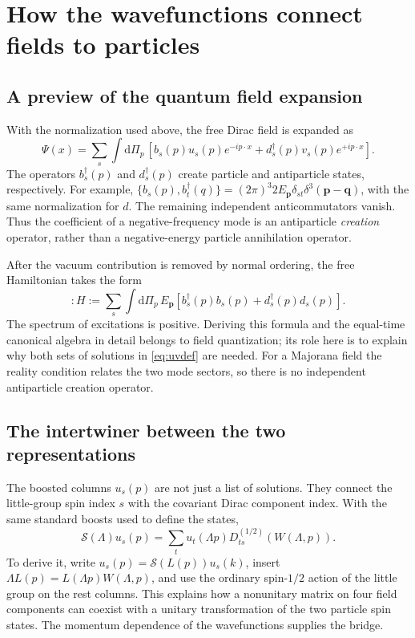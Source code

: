 \documentclass[11pt]{article}
\newcommand{\dd}{\mathrm{d}}
\begin{document}
\section{How the wavefunctions connect fields to particles}
\subsection{A preview of the quantum field expansion}
With the normalization used above, the free Dirac field is expanded as
\begin{equation}
 \Psi(x)=\sum_s\int\dd\Pi_p\,
 \left[b_s(p)u_s(p)e^{-ip\cdot x}
          +d_s^\dagger(p)v_s(p)e^{+ip\cdot x}\right].
 \label{eq:fieldexpansion}
\end{equation}
The operators \(b_s^\dagger(p)\) and \(d_s^\dagger(p)\) create
particle and antiparticle states, respectively. For example,
\(\{b_s(p),b_t^\dagger(q)\}=(2\pi)^3 2E_{\bm p}
\delta_{st}\delta^3(\bm p-\bm q)\), with the same normalization
for \(d\). The remaining independent anticommutators vanish.
Thus the coefficient of a negative-frequency mode is an antiparticle
\emph{creation} operator, rather than a negative-energy particle
annihilation operator.

After the vacuum contribution is removed by normal ordering, the
free Hamiltonian takes the form
\begin{equation}
 :H:=\sum_s\int\dd\Pi_p\,E_{\bm p}
          \left[b_s^\dagger(p)b_s(p)+d_s^\dagger(p)d_s(p)\right].
 \label{eq:positiveH}
\end{equation}
The spectrum of excitations is positive. Deriving this formula and
the equal-time canonical algebra in detail belongs to field
quantization; its role here is to explain why both sets of solutions
in \eqref{eq:uvdef} are needed. For a Majorana field the reality
condition relates the two mode sectors, so there is no independent
antiparticle creation operator.

\subsection{The intertwiner between the two representations}
The boosted columns \(u_s(p)\) are not just a list of solutions.
They connect the little-group spin index \(s\) with the covariant
Dirac component index. With the same standard boosts used to define
the states,
\begin{equation}
 \mathcal S(\Lambda)u_s(p)
   =\sum_tu_t(\Lambda p)
      D^{(1/2)}_{ts}\!\left(W(\Lambda,p)\right).
 \label{eq:intertwiner}
\end{equation}
To derive it, write
\(u_s(p)=\mathcal S(L(p))u_s(k)\), insert
\(\Lambda L(p)=L(\Lambda p)W(\Lambda,p)\), and use the
ordinary spin-\(1/2\) action of the little group on the rest columns.
This explains how a nonunitary matrix on four field components can
coexist with a unitary transformation of the two particle spin states.
The momentum dependence of the wavefunctions supplies the bridge.
\end{document}
